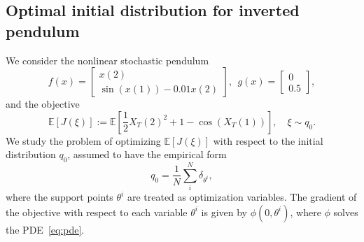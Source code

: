 \documentclass[letterpaper, 10 pt, conference]{ieeeconf}  %
\def\Expect{{\mathbb E}}
\begin{document}
\subsection{Optimal initial distribution for inverted pendulum}\label{sec:num-ip}
We consider the nonlinear stochastic pendulum
\begin{equation*}
    f(x) = \begin{bmatrix}x(2)\\\sin(x(1))-0.01x(2)\end{bmatrix}, ~~g(x) = \begin{bmatrix}
        0\\0.5
    \end{bmatrix},
\end{equation*}
and the objective 
\begin{equation}
    \Expect[J(\xi)] := \Expect \left[\frac{1}{2}X_T(2)^2 + 1-\cos(X_T(1)) \right],\quad \xi \sim q_0.  
\end{equation}
We study the problem of optimizing $\Expect[J(\xi)]$ with respect to the initial distribution $q_0$, assumed to have the empirical form
\begin{equation*}
    q_0 = \frac{1}{N}\sum_i^N \delta_{\theta^i}, 
\end{equation*}
where the support points $\theta^i$ are treated as optimization variables. The gradient of the objective with respect to each variable  $\theta^i$ is given by $\phi(0,\theta^i)$, where $\phi$ solves the PDE~\eqref{eq:pde}. 
\end{document}
